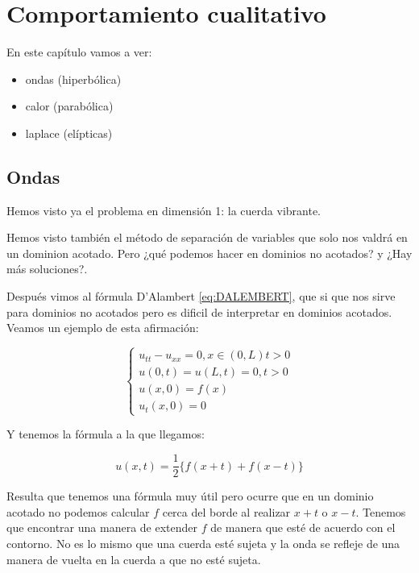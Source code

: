 \chapter{Comportamiento cualitativo}


En este capítulo vamos a ver:

\begin{itemize}

	\item ondas (hiperbólica)
	\item calor (parabólica)
	\item laplace (elípticas)

\end{itemize}


\section{Ondas}

	Hemos visto ya el problema en dimensión 1: la cuerda vibrante.

	Hemos visto también el método de separación de variables que solo nos valdrá en un dominion acotado. Pero ¿qué podemos hacer en dominios no acotados? y ¿Hay más soluciones?.

	Después vimos al fórmula D'Alambert \ref{eq:DALEMBERT}, que si que nos sirve para dominios no acotados pero es dificil de interpretar en dominios acotados. Veamos un ejemplo de esta afirmación:

	\begin{example}

		\[\begin{cases}
			u_{tt} - u_{xx} = 0, x \in (0,L) t > 0 \\
			u(0,t) = u(L,t) = 0, t > 0\\
			u(x,0) = f(x) \\
			u_t(x,0) = 0
		\end{cases}\]

		Y tenemos la fórmula a la que llegamos:

		\[ u(x,t) = \frac{1}{2} \{f(x+t)+f(x-t)\}  \]

		Resulta que tenemos una fórmula muy útil pero ocurre que en un dominio acotado no podemos calcular $f$ cerca del borde al realizar $x+t$ o $x-t$. Tenemos que encontrar una manera de extender $f$ de manera que esté de acuerdo con el contorno. No es lo mismo que una cuerda esté sujeta y la onda se refleje de una manera de vuelta en la cuerda a que no esté sujeta.

		\begin{center}
		\end{center}

	\end{example}


